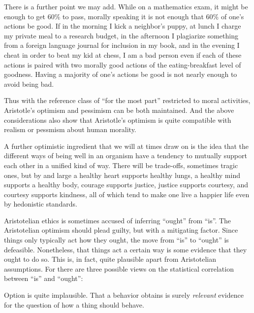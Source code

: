 There is a further point we may add. While on a mathematics exam, it might be enough to get 60\% to pass,
morally speaking it is not enough that 60\% of one's actions be good. If in the morning I kick a neighbor's puppy,
at lunch I charge my private meal to a research budget, in the afternoon I plagiarize something from a foreign
language journal for inclusion in my book, and in the evening I cheat in order to beat my kid at chess, I am a bad
person even if each of these actions is paired with two morally good actions of the eating-breakfast level of 
goodness. Having a majority of one's actions be good is not nearly enough to avoid being bad. 

Thus with the reference class of ``for the most part'' restricted to moral activities, Aristotle's optimism and pessimism
can be both maintained. And the above considerations also show that Aristotle's optimism is quite compatible with 
realism or pessmism about human morality.

A further optimistic ingredient that we will at times draw on is the idea that the different ways of being
well in an organism have a tendency to mutually support each other in a unified kind of way. There will be
trade-offs, sometimes tragic ones, but by and large a healthy heart supports healthy lungs, a healthy mind supports a healthy body,
courage supports justice, justice supports courtesy, and courtesy supports kindness, all of which tend to make
one live a happier life even by hedonistic standards. 

Aristotelian ethics is sometimes accused of inferring ``ought'' from ``is''. The Aristotelian optimism should plead
guilty, but with a mitigating factor. Since things only typically act how they ought, the move from ``is'' to ``ought''
is defeasible. Nonetheless, that things act a certain way is some evidence that they ought to do so. This is, in fact,
quite plausible apart from Aristotelian assumptions. For there are three possible views on the statistical correlation
between ``is'' and ``ought'':

Option  is quite implausible. That a behavior obtains is surely \textit{relevant} evidence for
the question of how a thing should behave. 

